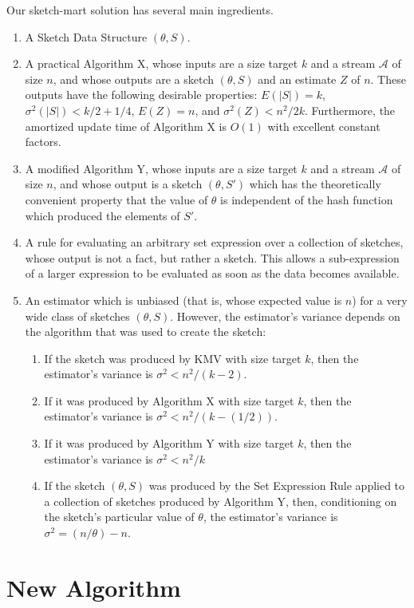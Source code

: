 \documentclass{sig-alternate}
\begin{document}
Our sketch-mart solution has several main ingredients.

\begin{enumerate}
\item A Sketch Data Structure $(\theta, S)$.
\item A practical Algorithm X, whose inputs are a size target $k$ and a stream $\mathcal{A}$ of size $n$,
and whose outputs are a sketch $(\theta, S)$ and an estimate $Z$ of $n$. These outputs have the following desirable properties:
$E(|S|) = k$, $\sigma^2(|S|) < k/2 + 1/4$, $E(Z) = n$, and
$\sigma^2(Z) < n^2/2k$. Furthermore, the amortized update time of Algorithm X is $O(1)$ with excellent constant factors.
\item A modified Algorithm Y, whose inputs are a size target $k$ and a stream $\mathcal{A}$ of size $n$,
and whose output is a sketch $(\theta, S')$ which has the theoretically convenient property that the
value of $\theta$ is independent of the hash function which produced the elements of $S'$. 
\item A rule for evaluating an arbitrary set expression over a collection of sketches, whose output is not a fact, but rather a sketch.
This allows a sub-expression of a larger expression to be evaluated as soon as the data becomes available.
\item An estimator which is unbiased (that is, whose expected value is $n$)
for a very wide class of sketches $(\theta, S)$. However, the estimator's variance depends on the algorithm
that was used to create the sketch:
\begin{enumerate}
\item If the sketch was produced by KMV with size target $k$, then the estimator's variance is $\sigma^2 < n^2/(k-2)$.
\item If it was produced by Algorithm X with size target $k$, then the estimator's variance is $\sigma^2 < n^2/(k-(1/2))$.
\item If it was produced by Algorithm Y with size target $k$, then the estimator's variance is $\sigma^2 < n^2/k$
\item If the sketch $(\theta, S)$ was produced by the Set Expression Rule applied to a collection of sketches produced by Algorithm Y, 
then, conditioning on the sketch's particular value of $\theta$, the estimator's variance is $\sigma^2 = (n/\theta) - n$.
\end{enumerate}
\end{enumerate}

\section{New Algorithm}
\end{document}
